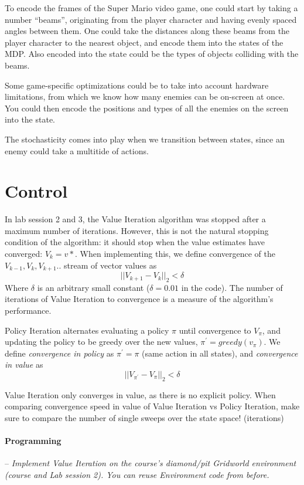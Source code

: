 \documentclass[a4paper]{article}
\newcommand{\programming}[1]{
\paragraph{Programming} -- \textit{#1}

}
\begin{document}
			To encode the frames of the Super Mario video game, one could start by taking a number ``beams'', originating from the player character and having evenly spaced angles between them.
			One could take the distances along these beams from the player character to the nearest object, and encode them into the states of the MDP.
			Also encoded into the state could be the types of objects colliding with the beams.

			Some game-specific optimizations could be to take into account hardware limitations, from which we know how many enemies can be on-screen at once.
			You could then encode the positions and types of all the enemies on the screen into the state.

			The stochasticity comes into play when we transition between states, since an enemy could take a multitide of actions.


	\section{Control}
		In lab session 2 and 3, the Value Iteration algorithm was stopped after a maximum number of iterations. 
		However, this is not the natural stopping condition of the algorithm: it should stop when the value estimates have converged: $V_k = v*$. 
		When implementing this, we define convergence of the $V_{k-1},V_k,V_{k+1}..$ stream of vector values as $$ \vert\vert V_{k+1} - V_k \vert\vert_2 < \delta $$
		Where $\delta$ is an arbitrary small constant ($\delta = 0.01$ in the code). 
		The number of iterations of Value Iteration to convergence is a measure of the algorithm's performance.

		Policy Iteration alternates evaluating a policy $\pi$ until convergence to $V_\pi$, and updating the policy to be greedy over the new values, $\pi ^\prime = greedy(v_\pi)$. 
		We define \textit{convergence in policy} as  $\pi^\prime = \pi$ (same action in all states), and \textit{convergence in value} as $$ \vert\vert V_{\pi ^\prime} - V_\pi \vert\vert_2 < \delta $$

		Value Iteration only converges in value, as there is no explicit policy. 
		When comparing convergence speed in value of Value Iteration vs Policy Iteration, make sure to compare the number of single sweeps over the state space! (iterations)

		\programming{Implement Value Iteration on the course's diamond/pit Gridworld environment (course and Lab session 2). 
				You can reuse Environment code from before.}
\end{document}
